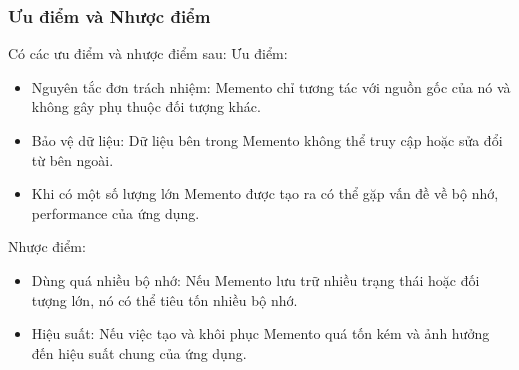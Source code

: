 \subsubsection{Ưu điểm và Nhược điểm}
Có các ưu điểm và nhược điểm sau:
Ưu điểm:
\begin{itemize}
    \item Nguyên tắc đơn trách nhiệm: Memento chỉ tương tác với nguồn gốc của nó và không gây phụ thuộc đối tượng khác.
    \item Bảo vệ dữ liệu: Dữ liệu bên trong Memento không thể truy cập hoặc sửa đổi từ bên ngoài.
    \item Khi có một số lượng lớn Memento được tạo ra có thể gặp vấn đề về bộ nhớ, performance của ứng dụng.
\end{itemize}
Nhược điểm:
\begin{itemize}
    \item Dùng quá nhiều bộ nhớ: Nếu Memento lưu trữ nhiều trạng thái hoặc đối tượng lớn, nó có thể tiêu tốn nhiều bộ nhớ.
    \item Hiệu suất: Nếu việc tạo và khôi phục Memento quá tốn kém và ảnh hưởng đến hiệu suất chung của ứng dụng.
\end{itemize}
